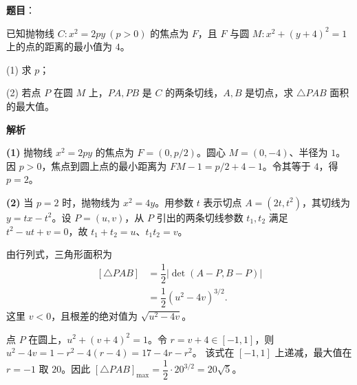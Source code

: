 \begin{answer}

\textbf{题目}：

已知抛物线 $C:x^2=2py\ (p>0)$ 的焦点为 $F$，且 $F$ 与圆 $M:x^2+(y+4)^2=1$ 上的点的距离的最小值为 $4$。

  (1) 求 $p$；

  (2) 若点 $P$ 在圆 $M$ 上，$PA,PB$ 是 $C$ 的两条切线，$A,B$ 是切点，求 $\triangle PAB$ 面积的最大值。

\textbf{解析}

\textbf{(1)} 抛物线 $x^2=2py$ 的焦点为 $F=(0,p/2)$。圆心 $M=(0,-4)$、半径为 $1$。因 $p>0$，焦点到圆上点的最小距离为 $FM-1=p/2+4-1$。令其等于 $4$，得 $p=2$。

\textbf{(2)} 当 $p=2$ 时，抛物线为 $x^2=4y$。用参数 $t$ 表示切点 $A=(2t,t^2)$，其切线为 $y=tx-t^2$。设 $P=(u,v)$，从 $P$ 引出的两条切线参数 $t_1,t_2$ 满足
$t^2-ut+v=0$，故 $t_1+t_2=u$、$t_1t_2=v$。

由行列式，三角形面积为
\nopagebreak[4]
\[
\begin{aligned}
[\triangle PAB]&=\dfrac12\left|\det(A-P,B-P)\right|\\
&=\dfrac12(u^2-4v)^{3/2}.
\end{aligned}
\]
这里 $v<0$，且根差的绝对值为 $\sqrt{u^2-4v}$。

点 $P$ 在圆上，$u^2+(v+4)^2=1$。令 $r=v+4\in[-1,1]$，则
$u^2-4v=1-r^2-4(r-4)=17-4r-r^2$。
该式在 $[-1,1]$ 上递减，最大值在 $r=-1$ 取 $20$。因此
$[\triangle PAB]_{\max}=\dfrac12\cdot20^{3/2}=20\sqrt5$。



\end{answer}
